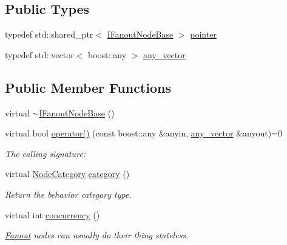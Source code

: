 \subsection*{Public Types}
\begin{DoxyCompactItemize}
\item 
typedef std\+::shared\+\_\+ptr$<$ \hyperlink{class_wire_cell_1_1_i_fanout_node_base}{I\+Fanout\+Node\+Base} $>$ \hyperlink{class_wire_cell_1_1_i_fanout_node_base_a0c125eb41bc2290d1ffd5d93ea0185ac}{pointer}
\item 
typedef std\+::vector$<$ boost\+::any $>$ \hyperlink{class_wire_cell_1_1_i_fanout_node_base_a855b32ed7f2d37d84aaf21e94edeacc4}{any\+\_\+vector}
\end{DoxyCompactItemize}
\subsection*{Public Member Functions}
\begin{DoxyCompactItemize}
\item 
virtual \hyperlink{class_wire_cell_1_1_i_fanout_node_base_a2f3f4b680932e70f5a04146d06a781ef}{$\sim$\+I\+Fanout\+Node\+Base} ()
\item 
virtual bool \hyperlink{class_wire_cell_1_1_i_fanout_node_base_a2d8314d252381eaeb96c43f312eda8b7}{operator()} (const boost\+::any \&anyin, \hyperlink{class_wire_cell_1_1_i_fanout_node_base_a855b32ed7f2d37d84aaf21e94edeacc4}{any\+\_\+vector} \&anyout)=0
\begin{DoxyCompactList}\small\item\em The calling signature\+: \end{DoxyCompactList}\item 
virtual \hyperlink{class_wire_cell_1_1_i_node_a5546e64cbb70bd3ac787295cac9ac803}{Node\+Category} \hyperlink{class_wire_cell_1_1_i_fanout_node_base_a9532dcaebc70f1ecdfaf3526c32f8c40}{category} ()
\begin{DoxyCompactList}\small\item\em Return the behavior category type. \end{DoxyCompactList}\item 
virtual int \hyperlink{class_wire_cell_1_1_i_fanout_node_base_abda7275bd1a34eab0dfffa8dc29f3b61}{concurrency} ()
\begin{DoxyCompactList}\small\item\em \hyperlink{class_wire_cell_1_1_fanout}{Fanout} nodes can usually do their thing stateless. \end{DoxyCompactList}\end{DoxyCompactItemize}


